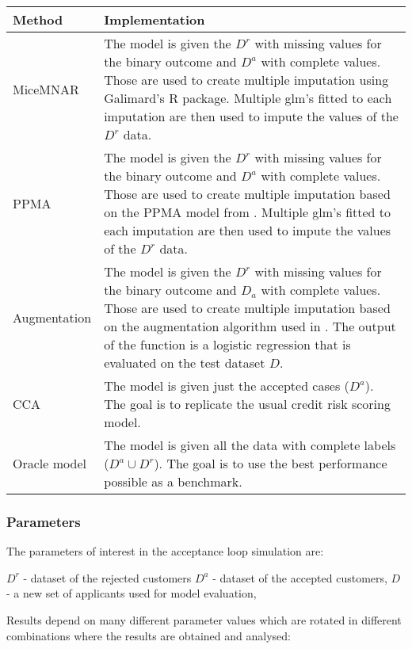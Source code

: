\documentclass[11pt,a4paper]{article}
\begin{document}
\begin{center}
    \begin{tabular}{  l  p{12 cm} }
        \toprule
\textbf{Method}      
& \textbf{Implementation}    \\\midrule
MiceMNAR
&  The model is given the $D^r$ with missing values for the binary outcome and $D^a$ with complete values. Those are used to create multiple imputation using Galimard's R package. Multiple glm's fitted to each imputation are then used to impute the values of the $D^r$ data. \\\hline
PPMA & The model is given the $D^r$ with missing values for the binary outcome and $D^a$ with complete values. Those are used to create multiple imputation based on the PPMA model from \cite{Andridge_Little_2020}. Multiple glm's fitted to each imputation are then used to impute the values of the $D^r$ data.  \\\hline
Augmentation
& The model is given the $D^r$ with missing values for the binary outcome and $D_a$ with complete values. Those are used to create multiple imputation based on the augmentation algorithm used in  \cite{ehrhardt_reject_2021}. The output of the function is a logistic regression that is evaluated on the test dataset $D$.  \\\hline
CCA & The model is given just the accepted cases ($D^a$). The goal is to replicate the usual credit risk scoring model. \\\hline
Oracle model & The model is given all the data with complete labels ($D^{a} \cup D^{r}$). The goal is to use the best performance possible as a benchmark. 
    \end{tabular}
\end{center}


\subsubsection{Parameters} \label{parameters}

The parameters of interest in the acceptance loop simulation are: 

$D^r$ - dataset of the rejected customers
$D^a$ -  dataset of the accepted customers,
$D$ - a new set of applicants used for model evaluation, 

Results depend on many different parameter values which are rotated in different combinations where the results are obtained and analysed: 
\end{document}
